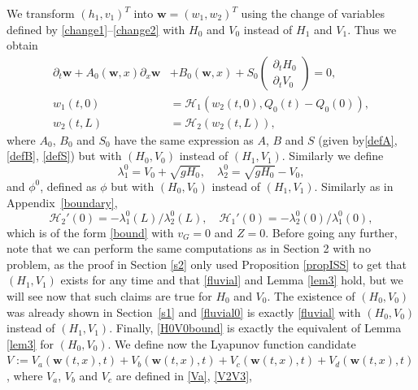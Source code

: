 \documentclass[JEP,XML,SOM,Unicode]{cedram}
\let\mathcal\mathscr
\theoremstyle{definition}
\begin{document}
We transform $(h_{1},v_{1})^{T}$ into $\boldsymbol{w}=(w_{1},w_{2})^{T}$ using the change of variables defined by
\eqref{change1}--\eqref{change2} with $H_{0}$ and $V_{0}$ instead of $H_{1}$ and $V_{1}$. Thus we obtain
\begin{equation}
\begin{split}
\partial_{t}\boldsymbol{w}+A_{0}(\boldsymbol{w},x)\partial_{x}\boldsymbol{w}&+B_{0}(\boldsymbol{w},x)+S_{0}\begin{pmatrix}\partial_{t}H_{0}\\ \partial_{t}V_{0}\end{pmatrix}=0,\\
w_{1}(t,0)&=\mathcal{H}_{1}(w_{2}(t,0),Q_{0}(t)-Q_{0}(0)),\\
w_{2}(t,L)&=\mathcal{H}_{2}(w_{2}(t,L)),
\end{split}
\label{sysw}
\end{equation}
where $A_{0}$, $B_{0}$ and $S_{0}$ have the same expression as $A$, $B$ and $S$ (given by\eqref{defA}, \eqref{defB}, \eqref{defS}) but with $(H_{0},V_{0})$ instead of $(H_{1}, V_{1})$. Similarly we define
\begin{equation*}
\lambda_{1}^{0}=V_{0}+\sqrt{gH_{0}},\quad\lambda_{2}^{0}=\sqrt{gH_{0}}-V_{0},
\end{equation*}
and $\phi^{0}$, defined as $\phi$ but with $(H_{0},V_{0})$ instead of $(H_{1}, V_{1})$.
Similarly as in Appendix~\ref{boundary},
\begin{equation*}
\mathcal{H}_{2}'(0)=-\lambda_{1}^{0}(L)/\lambda_{2}^{0}(L),\quad \mathcal{H}_{1}'(0)=-\lambda_{2}^{0}(0)/\lambda_{1}^{0}(0),
\end{equation*}
which is of the form \eqref{bound} with $v_{G}=0$ and $Z=0$.
Before going any further, note that we can perform the same computations as in Section 2 with no problem,
as the proof in Section \ref{s2} only used Proposition \ref{propISS} to get that $(H_{1},V_{1})$ exists for any time and that \eqref{fluvial} and Lemma \ref{lem3} hold, but we will see now that such claims are true for $H_{0}$ and $V_{0}$.
The existence of $(H_{0},V_{0})$ was already shown in Section~\ref{s1} and \eqref{fluvial0} is exactly \eqref{fluvial} with $(H_{0},V_{0})$ instead of $(H_{1},V_{1})$. Finally, \eqref{H0V0bound} is exactly the equivalent of Lemma \ref{lem3} for $(H_{0},V_{0})$.
We define now the Lyapunov function candidate $V:=V_{a}(\boldsymbol{w}(t,x),t)+V_{b}(\boldsymbol{w}(t,x),t)+V_{c}(\boldsymbol{w}(t,x),t)+V_{d}(\boldsymbol{w}(t,x),t)$, where $V_{a}$, $V_{b}$ and $V_{c}$ are defined in \eqref{Va}, \eqref{V2V3},
\end{document}
